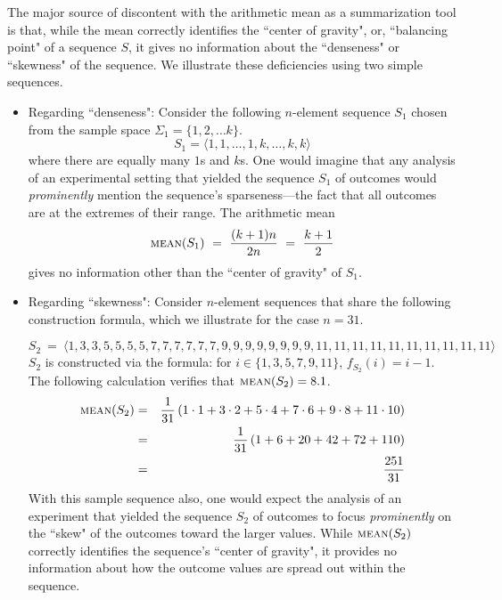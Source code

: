 The major source of discontent with the arithmetic mean as a summarization tool is that, while the mean correctly identifies the ``center of gravity", or, ``balancing point" of a sequence $S$, it gives no information about the ``denseness" or ``skewness" of the sequence.  We illustrate these deficiencies using two simple sequences.
  
\begin{itemize}
\item
Regarding ``denseness":
Consider the following $n$-element sequence $S_1$ chosen from the sample space $\Sigma_1 = \{1, 2, \ldots k\}$.
\[ S_1 = \langle 1, 1, \ldots, 1, k, \ldots, k, k \rangle \]
where there are equally many $1$s and $k$s.  One would imagine that any analysis of an 
experimental setting that yielded the sequence $S_1$ of outcomes would {\em prominently} mention the sequence's sparseness---the fact that all outcomes are at the extremes of their range.  The arithmetic mean
\[  \mbox{\sc mean}(S_1) \ = \ \frac{(k+1)n}{2n} \ = \ {k+1 \over 2} \]
gives no information other than the ``center of gravity" of $S_1$.

\item
Regarding ``skewness":
Consider $n$-element sequences that share the following construction formula, which
we illustrate for the case $n=31$.

{\small
\[ S_2 \ = \ \langle 
1,
3,3,
5,5,5,5,
7,7,7,7,7,7,
9,9,9,9,9,9,9,9,
11,11,11,11,11,11,11,11,11,11
\rangle \]
} 
\hspace*{-.1in} $S_2$ is constructed via the formula: for $i \in \{1,3,5,7,9,11\}$, 
$f_{S_2}(i) = i-1$.  The following calculation verifies that $\mbox{\sc mean}(S_2) = 8.1$. 
\begin{eqnarray*}
\mbox{\sc mean}(S_2)
 & = & 
{1 \over 31}
\left(
1 \cdot 1 +
3 \cdot 2 +
5 \cdot 4 +
7 \cdot 6 +
9 \cdot 8 +
11 \cdot 10
\right)
 \\
  & = & 
{1 \over 31}
\left(
 1 + 6 + 20 + 42 + 72 + 110
\right)
 \\
  & = & 
\frac{251}{31}
\end{eqnarray*}
With this sample sequence also, one would expect the analysis of an experiment that yielded the sequence $S_2$ of outcomes to focus {\em prominently} on the ``skew" of the outcomes toward the
larger values.  While $\mbox{\sc mean}(S_2)$ correctly identifies the sequence's ``center of gravity", it provides no information about how the outcome values are spread out within the sequence.
\end{itemize}

